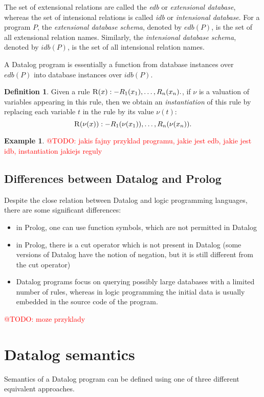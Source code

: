 \documentclass{pracamgr}
\makeatletter
\theoremstyle{plain}
\theoremstyle{definition}
\newtheorem{defn}{Definition}[section]
\newtheorem{exmp}{Example}[section]
\theoremstyle{remark}
\newcommand{\todo}[1]{\textcolor{red}{@TODO: #1}}
\makeatother
\begin{document}
The set of extensional relations are called the \emph{edb} or \emph{extensional database}, whereas the set of intensional relations is called \emph{idb} or \emph{intensional database}. For a program $P$, the \emph{extensional database schema}, denoted by $edb(P)$, is the set of all extensional relation names. Similarly, the \emph{intensional database schema}, denoted by $idb(P)$, is the set of all intensional relation names. 

A Datalog program is essentially a function from database instances over $edb(P)$ into database instances over $idb(P)$.

\begin{defn}
Given a rule $ \textsc{R}(x) :- R_1(x_1), \dots, R_n(x_n). $, if $\nu$ is a valuation of variables appearing in this rule, then we obtain an \emph{instantiation} of this rule by replacing each variable $t$ in the rule by its value $\nu(t)$:
$$ \textsc{R}(\nu(x)) :- R_1(\nu(x_1)), \dots, R_n(\nu(x_n)). $$
\end{defn}

\begin{exmp}
\todo{jakis fajny przyklad programu, jakie jest edb, jakie jest idb, instantiation jakiejs reguly}
\end{exmp}

\subsection{Differences between Datalog and Prolog}
Despite the close relation between Datalog and logic programming languages, there are some significant differences:
\begin{itemize}
\item in Prolog, one can use function symbols, which are not permitted in Datalog
\item in Prolog, there is a cut operator which is not present in Datalog (some versions of Datalog have the notion of negation, but it is still different from the cut operator)
\item Datalog programs focus on querying possibly large databases with a limited number of rules, whereas in logic programming the initial data is usually embedded in the source code of the program.
\end{itemize}

\todo{moze przyklady}

\section{Datalog semantics}
Semantics of a Datalog program can be defined using one of three different equivalent approaches.
\end{document}
